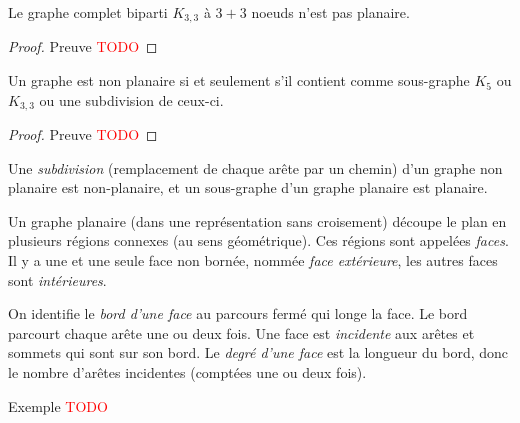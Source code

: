 \begin{mytheo}
Le graphe complet biparti $K_{3,3}$ à $3+3$ noeuds n'est pas planaire.
\begin{proof}
Preuve \textcolor{red}{TODO}
\end{proof}
\end{mytheo}



\begin{mytheo} [Kuratowski]
  Un graphe est non planaire si et seulement s'il contient comme sous-graphe $K_5$ ou $K_{3,3}$ ou une subdivision de ceux-ci.
  \begin{proof}
    Preuve \textcolor{red}{TODO}
  \end{proof}
\end{mytheo}


\begin{mydef}
  Une \emph{subdivision} (remplacement de chaque arête par un chemin) d'un graphe non planaire est non-planaire, et un sous-graphe d'un graphe planaire est planaire.
\end{mydef}

\begin{mydef}
  Un graphe planaire (dans une représentation sans croisement) découpe le plan en plusieurs régions connexes (au sens géométrique). Ces régions sont appelées \emph{faces}. Il y a une et une seule face non bornée, nommée \emph{face extérieure}, les autres faces sont \emph{intérieures}.
\end{mydef}

\begin{mydef}
  On identifie le \emph{bord d'une face} au parcours fermé qui longe la face. Le bord parcourt chaque arête une ou deux fois. 
  Une face est \emph{incidente} aux arêtes et sommets qui sont sur son bord.
  Le \emph{degré d'une face} est la longueur du bord, donc le nombre d'arêtes incidentes (comptées une ou deux fois).
\end{mydef}
\begin{myexem}
  Exemple \textcolor{red}{TODO}
\end{myexem}


